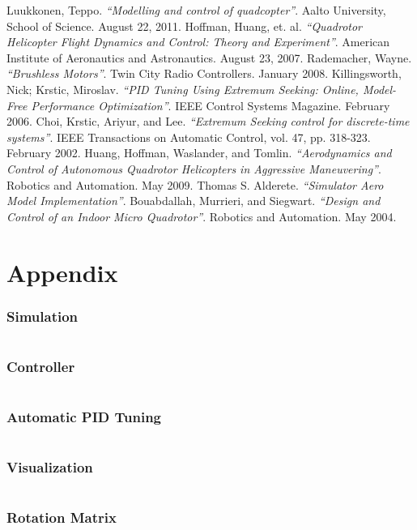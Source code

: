 \documentclass{article}
\begin{document}
\begin{thebibliography}{9}
        Luukkonen, Teppo.
        \emph{``Modelling and control of quadcopter''}.
        Aalto University, School of Science.
        August 22, 2011.
        Hoffman, Huang, et. al.
        \emph{``Quadrotor Helicopter Flight Dynamics and Control: Theory and Experiment''}.
        American Institute of Aeronautics and Astronautics.
        August 23, 2007.
        Rademacher, Wayne. \emph{``Brushless Motors''}. 
        Twin City Radio Controllers.
        January 2008.
        Killingsworth, Nick; Krstic, Miroslav.
        \emph{``PID Tuning Using Extremum Seeking: Online, Model-Free Performance Optimization''}.
        IEEE Control Systems Magazine.
        February 2006.
        Choi, Krstic, Ariyur, and Lee. 
        \emph{``Extremum Seeking control for discrete-time systems''}.
        IEEE Transactions on Automatic Control, vol. 47, pp. 318-323.
        February 2002.
        Huang, Hoffman, Waslander, and Tomlin.
        \emph{``Aerodynamics and Control of Autonomous Quadrotor Helicopters in Aggressive Maneuvering''}.
        Robotics and Automation.
        May 2009.
        Thomas S. Alderete.
        \emph{``Simulator Aero Model Implementation''}.
        Bouabdallah, Murrieri, and Siegwart.
        \emph{``Design and Control of an Indoor Micro Quadrotor''}.
        Robotics and Automation.
        May 2004.
\end{thebibliography}

\newpage
\section*{Appendix}
\subsubsection*{Simulation}
\inputminted[mathescape, fontsize=\scriptsize]{matlab}{matlab/simulate.m}
\subsubsection*{Controller}
\inputminted[mathescape, fontsize=\scriptsize]{matlab}{matlab/controller.m}
\subsubsection*{Automatic PID Tuning}
\inputminted[mathescape, fontsize=\scriptsize]{matlab}{matlab/tune.m}
\newpage
\subsubsection*{Visualization}
\inputminted[mathescape, fontsize=\scriptsize]{matlab}{matlab/visualize.m}
\newpage
\subsubsection*{Rotation Matrix}
\inputminted[mathescape, fontsize=\scriptsize]{matlab}{matlab/rotation.m}
\end{document}
